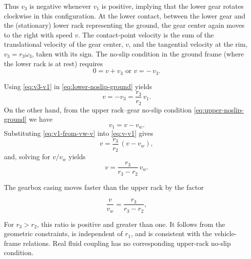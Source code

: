 \documentclass[reprint,aps,pra,longbibliography]{revtex4-2}
\begin{document}
Thus \(v_3\) is negative whenever \(v_1\) is positive, implying that the lower
gear rotates clockwise in this configuration.
At the lower contact, between the lower gear and the (stationary) lower rack
representing the ground, the gear center again moves to the right with speed
$v$.
The contact-point velocity is the sum of the translational velocity of the gear
center, \(v\), and the tangential velocity at the rim, \(v_3 = r_3 \omega_3\),
taken with its sign.
The no-slip condition in the ground frame (where the lower rack is at rest)
requires
\begin{equation}
0 = v + v_3
\text{ or }
v = -\,v_3.
\label{eq:lower-noslip-ground}
\end{equation}

Using \eqref{eq:v3-v1} in \eqref{eq:lower-noslip-ground} yields
\begin{equation}
v = -v_3 = \frac{r_3}{r_2}\,v_1.
\label{eq:v-v1}
\end{equation}
On the other hand, from the upper rack--gear no-slip condition
\eqref{eq:upper-noslip-ground} we have
\begin{equation}
v_1 = v - v_w.
\label{eq:v1-from-vw-v}
\end{equation}
Substituting \eqref{eq:v1-from-vw-v} into \eqref{eq:v-v1} gives
\[
v = \frac{r_3}{r_2}\,(v - v_w),
\]
and, solving for $ {v}/{v_w}$  yields
\begin{equation}
 v = \frac{r_3}{r_3 - r_2}\, {v_w}.
\label{eq:v-vw-ratio}
\end{equation}

The gearbox casing moves faster than the upper rack by the factor

\begin{equation}
 \frac{v}{v_w} = \frac{r_3}{r_3 - r_2},
\label{eq:amp-v-vw-ratio}
\end{equation}

For \(r_3>r_2\), this ratio is positive and greater than one. It follows from the geometric constraints, is independent of \(r_1\), and is consistent with the vehicle-frame relations. Real fluid coupling has no corresponding upper-rack no-slip condition.
\end{document}
